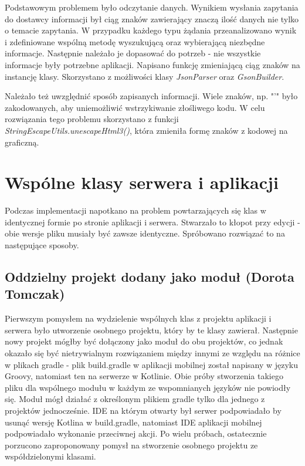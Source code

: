 \documentclass[10pt,twoside,a4paper]{report}
\begin{document}
\par Podstawowym problemem było odczytanie danych. Wynikiem wysłania zapytania do dostawcy informacji był ciąg znaków zawierający znaczą ilość danych nie tylko o temacie zapytania. W przypadku każdego typu żądania przeanalizowano wynik i zdefiniowane wspólną metodę wyszukującą oraz wybierającą niezbędne informacje. Następnie należało je dopasować do potrzeb - nie wszystkie informacje były potrzebne aplikacji. Napisano funkcję zmieniającą ciąg znaków na instancję klasy. Skorzystano z możliwości klasy \textit{JsonParser}\cite{JsonParser} oraz \textit{GsonBuilder}\cite{GsonBuilder}.

\par Należało też uwzględnić sposób zapisanych informacji. Wiele znaków, np. "'" było zakodowanych, aby uniemożliwić wstrzykiwanie złośliwego kodu. W celu rozwiązania tego problemu skorzystano z funkcji \textit{StringEscapeUtils.unescapeHtml3()}\cite{escapeUtils}, która zmieniła formę znaków z kodowej na graficzną.

\section{Wspólne klasy serwera i aplikacji}
\par Podczas implementacji napotkano na problem powtarzających się klas w identycznej formie po stronie aplikacji i serwera. Stwarzało to kłopot przy edycji - obie wersje pliku musiały być zawsze identyczne. Spróbowano rozwiązać to na następujące sposoby.

\subsection{Oddzielny projekt dodany jako moduł (Dorota Tomczak)}
\par Pierwszym pomysłem na wydzielenie wspólnych klas z projektu aplikacji i serwera było utworzenie osobnego projektu, który by te klasy zawierał. Następnie nowy projekt mógłby być dołączony jako moduł do obu projektów, co jednak okazało się być nietrywialnym rozwiązaniem między innymi ze względu na różnice w plikach gradle - plik build.gradle w aplikacji mobilnej został napisany w języku Groovy, natomiast ten na serwerze w Kotlinie. Obie próby stworzenia takiego pliku dla wspólnego modułu w każdym ze wspomnianych języków nie powiodły się. Moduł mógł działać z określonym plikiem gradle tylko dla jednego z projektów jednocześnie. IDE na którym otwarty był serwer podpowiadało by usunąć wersję Kotlina w build.gradle, natomiast IDE aplikacji mobilnej podpowiadało wykonanie przeciwnej akcji. Po wielu próbach, ostatecznie porzucono zaproponowany pomysł na stworzenie osobnego projektu ze współdzielonymi klasami.
\end{document}
